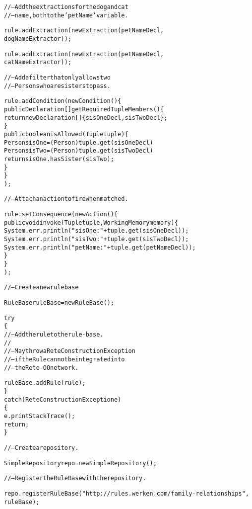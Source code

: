 \begin{alltt}
// -- Add the extractions for the dog and cat
// -- name, both to the 'petName' variable.

rule.addExtraction( new Extraction( petNameDecl,
                                    dogNameExtractor ) );

rule.addExtraction( new Extraction( petNameDecl,
                                    catNameExtractor ) );

// -- Add a filter that only allows two
// -- Persons who are sisters to pass.

rule.addCondition( new Condition() \{
        public Declaration[] getRequiredTupleMembers() \{
            return new Declaration[] \{ sisOneDecl, sisTwoDecl \};
        \}
        public boolean isAllowed(Tuple tuple) \{
            Person sisOne = (Person) tuple.get( sisOneDecl ) 
            Person sisTwo = (Person) tuple.get( sisTwoDecl ) 
            return sisOne.hasSister( sisTwo )	;
        \} 
    \}
      );

\newpage

// -- Attach an action to fire when matched.

rule.setConsequence( new Action() \{
        public void invoke(Tuple tuple, WorkingMemory memory) \{
            System.err.println( "sisOne: " + tuple.get( sisOneDecl ) );
            System.err.println( "sisTwo: " + tuple.get( sisTwoDecl ) );
            System.err.println( "petName: " + tuple.get( petNameDecl ) );
        \}
    \}
      );

// -- Create a new rule base

RuleBase ruleBase = new RuleBase();

try
\{
    // -- Add the rule to the rule-base.
    // 
    // -- May throw a ReteConstructionException 
    // -- if the Rule cannot be integrated into
    // -- the Rete-OO network.

    ruleBase.addRule( rule );
\}
catch (ReteConstructionException e)
\{
    e.printStackTrace();
    return;
\}

// -- Create a repository.

SimpleRepository repo = new SimpleRepository();

// -- Register the RuleBase with the repository.
	
repo.registerRuleBase( "http://rules.werken.com/family-relationships",
                       ruleBase );

\end{alltt}
\normalsize

\newpage
